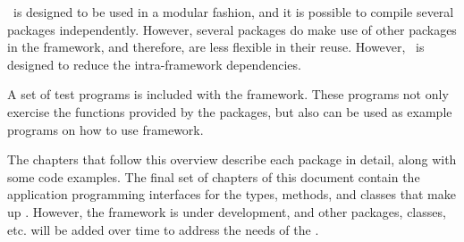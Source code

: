 \sname\ is designed to be used in a modular fashion, and it is possible to
compile several packages independently. However, several packages do make use
of other packages in the framework, and therefore, are less flexible in their
reuse. However, \sname\ is designed to reduce the intra-framework
dependencies.

A set of test programs is included with the framework. These programs not only
exercise the functions provided by the packages, but also can be used as
example programs on how to use framework.

The chapters that follow this overview describe each package in detail,
along with some code examples.
The final set of chapters of this document contain the application programming
interfaces for the types, methods, and classes that make up \sname. However,
the framework is under development, and other packages, classes, etc. will be
added over time to address the needs of the \nistig.
